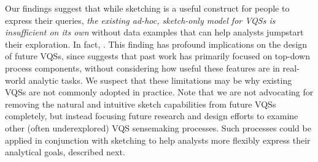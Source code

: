  \par Our findings suggest that while sketching
 is a useful construct for people to express their queries,
 \emph{the existing ad-hoc, sketch-only model for VQSs
 is insufficient on its own} without data examples
 that can help analysts jumpstart their exploration.
 In fact, . This finding has profound implications on the design of future VQSs, since  suggests that past work has primarily focused on top-down process components, without considering how useful these features are in real-world analytic tasks.
 We suspect that these limitations may be why existing VQSs are not commonly adopted in practice. Note that we are not advocating for removing the natural and intuitive sketch capabilities from future VQSs completely, but instead focusing future research and design efforts to examine other (often underexplored) VQS sensemaking processes. Such processes could be applied in conjunction with sketching to help analysts more flexibly express their analytical goals, described next.

